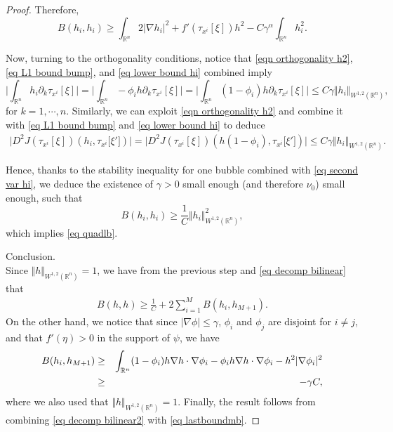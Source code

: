 \documentclass[11pt,letterpaper,reqno]{amsart}
\newcommand{\R}{\mathbb{R}}
\theoremstyle{plain}%
\theoremstyle{definition}
\numberwithin{equation}{section}
\numberwithin{figure}{section}
\begin{document}
\begin{proof}
Therefore,
\begin{equation}\label{eq second var hi}
	B(h_i,h_i) \geq \int_{\R^n} 2 |\nabla h_i|^2+f'(\tau_{x^i}[\xi]) h^2 -C\gamma^\alpha \int_{\R^n} h_i^2.
\end{equation}

Now, turning to the orthogonality conditions, notice that \eqref{eqn orthogonality h2}, \eqref{eq L1 bound bump}, and \eqref{eq lower bound hi} combined imply
\begin{equation}\label{eq almost ort hi der}
	\Big|\int_{\R^n} h_i \partial_k\tau_{x^i}[\xi]\Big|=\Big|\int_{\R^n} -\phi_i h  \partial_k\tau_{x^i}[\xi]\Big|=	\Big|\int_{\R^n} (1-\phi_i)h \partial_k\tau_{x^i}[\xi]\Big|  \leq	C\gamma \Vert h_i\Vert_{W^{1,2}(\R^n)},
\end{equation}
for $k=1,\cdots, n$. Similarly, we can exploit \eqref{eqn orthogonality h2} and combine it with \eqref{eq L1 bound bump} and \eqref{eq lower bound hi} to deduce
\begin{eqnarray}\label{eq almost ort hi}
 	\Big|D^2J(\tau_{x^i}[\xi])(h_i,\tau_{x^i}\big[\xi'\big])\Big| = \Big|D^2J(\tau_{x^i}[\xi])(h (1-\phi_i),\tau_{x^i}\big[\xi'\big])\Big|\leq C\gamma \Vert h_i\Vert_{W^{1,2}(\R^n)}.
\end{eqnarray}

 Hence, thanks to the stability inequality for one bubble combined with \eqref{eq second var hi}, we deduce the existence of $\gamma>0$ small enough (and therefore $\nu_0$) small enough, such that
$$	B(h_i,h_i) \geq\frac{1}{C} \Vert h_i\Vert_{W^{1,2}(\R^n)}^2,$$
which implies \eqref{eq quadlb}.\\

\medskip


 Conclusion.\\

Since $\Vert h\Vert_{W^{1,2}(\R^n)}=1$, we have from the previous step and \eqref{eq decomp bilinear} that
\begin{eqnarray}\label{eq decomp bilinear2}
	B(h,h)\geq \frac{1}{C}+ 2\sum_{i=1}^{M}B(h_{i},h_{M+1}).
\end{eqnarray}
On the other hand, we notice that since $|\nabla \phi|\leq \gamma$, $\phi_i$ and $\phi_j$ are disjoint for $i\neq j$, and that $f'(\eta) >0$ in the support of $\psi$, we have
\begin{eqnarray}\notag
    B(h_i, h_{M+1}) &\geq& \int_{\R^n} (1-\phi_i) h\nabla h\cdot \nabla \phi_i -  \phi_i h\nabla h\cdot \nabla  \phi_i - h^2|\nabla \phi_i|^2 \\\label{eq lastboundmb}
    &\geq& - \gamma C,
\end{eqnarray}
where we also used that $\Vert h\Vert_{W^{1,2}(\R^n)}=1$. Finally, the result follows from combining \eqref{eq decomp bilinear2} with \eqref{eq lastboundmb}.
\end{proof}
\end{document}

